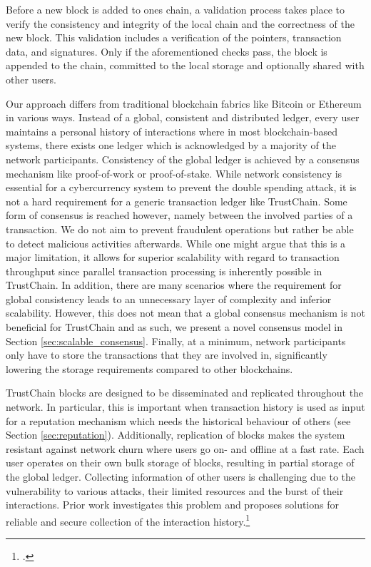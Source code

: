 \documentclass[USenglish]{article}
\begin{document}
Before a new block is added to ones chain, a validation process takes place to verify the consistency and integrity of the local chain and the correctness of the new block.
This validation includes a verification of the pointers, transaction data, and signatures.
Only if the aforementioned checks pass, the block is appended to the chain, committed to the local storage and optionally shared with other users.

Our approach differs from traditional blockchain fabrics like Bitcoin or Ethereum in various ways.
Instead of a global, consistent and distributed ledger, every user maintains a personal history of interactions where in most blockchain-based systems, there exists one ledger which is acknowledged by a majority of the network participants.
Consistency of the global ledger is achieved by a consensus mechanism like proof-of-work or proof-of-stake.
While network consistency is essential for a cybercurrency system to prevent the double spending attack, it is not a hard requirement for a generic transaction ledger like TrustChain.
Some form of consensus is reached however, namely between the involved parties of a transaction.
We do not aim to prevent fraudulent operations but rather be able to detect malicious activities afterwards.
While one might argue that this is a major limitation, it allows for superior scalability with regard to transaction throughput since parallel transaction processing is inherently possible in TrustChain.
In addition, there are many scenarios where the requirement for global consistency leads to an unnecessary layer of complexity and inferior scalability.
However, this does not mean that a global consensus mechanism is not beneficial for TrustChain and as such, we present a novel consensus model in Section \ref{sec:scalable_consensus}.
Finally, at a minimum, network participants only have to store the transactions that they are involved in, significantly lowering the storage requirements compared to other blockchains.

TrustChain blocks are designed to be disseminated and replicated throughout the network.
In particular, this is important when transaction history is used as input for a reputation mechanism which needs the historical behaviour of others (see Section \ref{sec:reputation}).
Additionally, replication of blocks makes the system resistant against network churn where users go on- and offline at a fast rate.
Each user operates on their own bulk storage of blocks, resulting in partial storage of the global ledger.
Collecting information of other users is challenging due to the vulnerability to various attacks, their limited resources and the burst of their interactions.
Prior work investigates this problem and proposes solutions for reliable and secure collection of the interaction history.\footcite{gkoroureducing}
\end{document}
